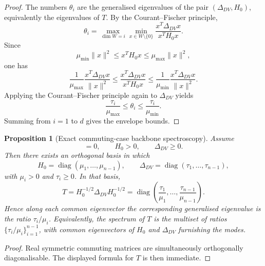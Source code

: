\documentclass[11pt,a4paper]{article}
\numberwithin{equation}{section}
\theoremstyle{thmcompact}
\newtheorem{proposition}[theorem]{Proposition}
\theoremstyle{remark}
\begin{document}
\begin{proof}
The numbers \(\theta_i\) are the generalised eigenvalues of the pair \((\Delta_{DV},H_0)\), equivalently the eigenvalues of \(T\). By the Courant--Fischer principle,
\begin{equation}
\theta_i
=
\max_{\dim W=i}
\min_{x\in W\setminus\{0\}}
\frac{x^T\Delta_{DV}x}{x^TH_0x}.
\end{equation}
Since
\begin{equation}
\mu_{\min}\|x\|^2
\le
x^TH_0x
\le
\mu_{\max}\|x\|^2,
\end{equation}
one has
\begin{equation}
\frac{1}{\mu_{\max}}\frac{x^T\Delta_{DV}x}{\|x\|^2}
\le
\frac{x^T\Delta_{DV}x}{x^TH_0x}
\le
\frac{1}{\mu_{\min}}\frac{x^T\Delta_{DV}x}{\|x\|^2}.
\end{equation}
Applying the Courant--Fischer principle again to \(\Delta_{DV}\) yields
\begin{equation}
\frac{\tau_i}{\mu_{\max}}
\le
\theta_i
\le
\frac{\tau_i}{\mu_{\min}}.
\end{equation}
Summing from \(i=1\) to \(d\) gives the envelope bounds.
\end{proof}

\begin{proposition}[Exact commuting-case backbone spectroscopy]
\label{prop:commuting_case_reduction}
Assume
\begin{equation}
[H_0,\Delta_{DV}]=0,
\qquad
H_0>0,
\qquad
\Delta_{DV}\ge 0.
\end{equation}
Then there exists an orthogonal basis in which
\begin{equation}
H_0=\operatorname{diag}(\mu_1,\dots,\mu_{n-1}),
\qquad
\Delta_{DV}=\operatorname{diag}(\tau_1,\dots,\tau_{n-1}),
\end{equation}
with \(\mu_i>0\) and \(\tau_i\ge 0\). In that basis,
\begin{equation}
T=H_0^{-1/2}\Delta_{DV}H_0^{-1/2}
=
\operatorname{diag}\!\left(\frac{\tau_1}{\mu_1},\dots,\frac{\tau_{n-1}}{\mu_{n-1}}\right).
\end{equation}
Hence along each common eigenvector the corresponding generalised eigenvalue is the ratio \(\tau_i/\mu_i\). Equivalently, the spectrum of \(T\) is the multiset of ratios \(\{\tau_i/\mu_i\}_{i=1}^{n-1}\), with common eigenvectors of \(H_0\) and \(\Delta_{DV}\) furnishing the modes.
\end{proposition}

\begin{proof}
Real symmetric commuting matrices are simultaneously orthogonally diagonalisable. The displayed formula for \(T\) is then immediate.
\end{proof}
\end{document}
